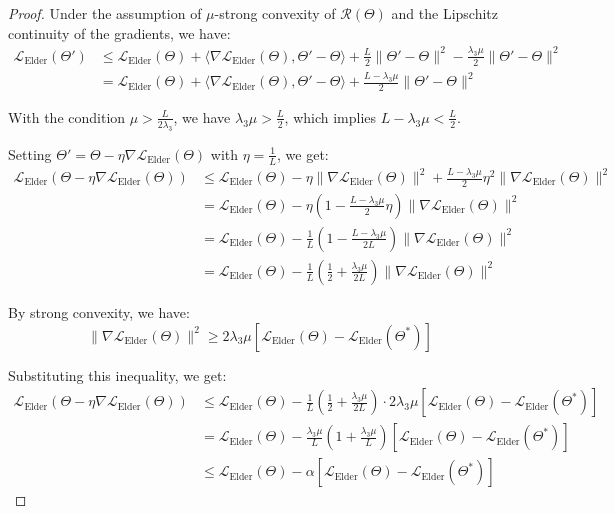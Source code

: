 \begin{proof}
Under the assumption of $\mu$-strong convexity of $\mathcal{R}(\Theta)$ and the Lipschitz continuity of the gradients, we have:
\begin{align}
\mathcal{L}_{\text{Elder}}(\Theta') &\leq \mathcal{L}_{\text{Elder}}(\Theta) + \langle \nabla \mathcal{L}_{\text{Elder}}(\Theta), \Theta' - \Theta \rangle + \frac{L}{2}\|\Theta' - \Theta\|^2 - \frac{\lambda_3 \mu}{2}\|\Theta' - \Theta\|^2 \\
&= \mathcal{L}_{\text{Elder}}(\Theta) + \langle \nabla \mathcal{L}_{\text{Elder}}(\Theta), \Theta' - \Theta \rangle + \frac{L - \lambda_3 \mu}{2}\|\Theta' - \Theta\|^2
\end{align}

With the condition $\mu > \frac{L}{2\lambda_3}$, we have $\lambda_3 \mu > \frac{L}{2}$, which implies $L - \lambda_3 \mu < \frac{L}{2}$.

Setting $\Theta' = \Theta - \eta \nabla \mathcal{L}_{\text{Elder}}(\Theta)$ with $\eta = \frac{1}{L}$, we get:
\begin{align}
\mathcal{L}_{\text{Elder}}(\Theta - \eta \nabla \mathcal{L}_{\text{Elder}}(\Theta)) &\leq \mathcal{L}_{\text{Elder}}(\Theta) - \eta\|\nabla \mathcal{L}_{\text{Elder}}(\Theta)\|^2 + \frac{L - \lambda_3 \mu}{2}\eta^2\|\nabla \mathcal{L}_{\text{Elder}}(\Theta)\|^2 \\
&= \mathcal{L}_{\text{Elder}}(\Theta) - \eta(1 - \frac{L - \lambda_3 \mu}{2}\eta)\|\nabla \mathcal{L}_{\text{Elder}}(\Theta)\|^2 \\
&= \mathcal{L}_{\text{Elder}}(\Theta) - \frac{1}{L}(1 - \frac{L - \lambda_3 \mu}{2L})\|\nabla \mathcal{L}_{\text{Elder}}(\Theta)\|^2 \\
&= \mathcal{L}_{\text{Elder}}(\Theta) - \frac{1}{L}(\frac{1}{2} + \frac{\lambda_3 \mu}{2L})\|\nabla \mathcal{L}_{\text{Elder}}(\Theta)\|^2
\end{align}

By strong convexity, we have:
\begin{equation}
\|\nabla \mathcal{L}_{\text{Elder}}(\Theta)\|^2 \geq 2\lambda_3 \mu [\mathcal{L}_{\text{Elder}}(\Theta) - \mathcal{L}_{\text{Elder}}(\Theta^*)]
\end{equation}

Substituting this inequality, we get:
\begin{align}
\mathcal{L}_{\text{Elder}}(\Theta - \eta \nabla \mathcal{L}_{\text{Elder}}(\Theta)) &\leq \mathcal{L}_{\text{Elder}}(\Theta) - \frac{1}{L}(\frac{1}{2} + \frac{\lambda_3 \mu}{2L}) \cdot 2\lambda_3 \mu [\mathcal{L}_{\text{Elder}}(\Theta) - \mathcal{L}_{\text{Elder}}(\Theta^*)] \\
&= \mathcal{L}_{\text{Elder}}(\Theta) - \frac{\lambda_3 \mu}{L}(1 + \frac{\lambda_3 \mu}{L})[\mathcal{L}_{\text{Elder}}(\Theta) - \mathcal{L}_{\text{Elder}}(\Theta^*)] \\
&\leq \mathcal{L}_{\text{Elder}}(\Theta) - \alpha [\mathcal{L}_{\text{Elder}}(\Theta) - \mathcal{L}_{\text{Elder}}(\Theta^*)]
\end{align}


\end{proof}
